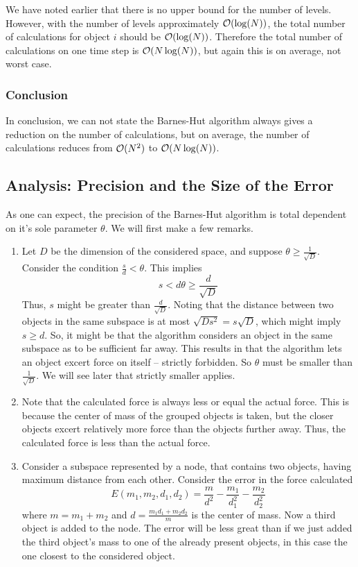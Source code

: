 We have noted earlier that there is no upper bound for the number of levels. 
However, with the number of levels approximately $\mathcal{O}(\log(N))$, the total number of calculations for object $i$ should be $\mathcal{O}(\log(N))$. 
Therefore the total number of calculations on one time step is $\mathcal{O}(N\log(N))$, but again this is on average, not worst case.

\subsubsection*{Conclusion}
In conclusion, we can not state the Barnes-Hut algorithm always gives a reduction on the number of calculations, but on average, the number of calculations reduces from $\mathcal{O}(N^2)$ to $\mathcal{O}(N\log(N))$.

\subsection{Analysis: Precision and the Size of the Error}
As one can expect, the precision of the Barnes-Hut algorithm is total dependent on it's sole parameter $\theta$. We will first make a few remarks.
\begin{enumerate}
\item Let $D$ be the dimension of the considered space, and suppose $\theta \geq \frac{1}{\sqrt{D}}$. Consider the condition $\frac{s}{d} < \theta$. This implies
\[
s < d\theta \geq \frac{d}{\sqrt{D}}
\]
Thus, $s$ might be greater than $\frac{d}{\sqrt{D}}$. Noting that the distance between two objects in the same subspace is at most $\sqrt{Ds^2} = s\sqrt{D}$, which might imply $s\geq d$. 
So, it might be that the algorithm considers an object in the same subspace as to be sufficient far away. 
This results in that the algorithm lets an object excert force on itself -- strictly forbidden. 
So $\theta$ must be smaller than $\frac{1}{\sqrt{D}}$. 
We will see later that strictly smaller applies.
\item Note that the calculated force is always less or equal the actual force. 
This is because the center of mass of the grouped objects is taken, but the closer objects excert relatively more force than the objects further away. 
Thus, the calculated force is less than the actual force.
\item Consider a subspace represented by a node, that contains two objects, having maximum distance from each other. Consider the error in the force calculated
\[
E(m_1,m_2,d_1,d_2) = \frac{m}{d^2}-\frac{m_1}{d_1^2}-\frac{m_2}{d_2^2}
\]
where $m = m_1+m_2$ and $d = \frac{m_1d_1+m_2d_2}{m}$ is the center of mass. 
Now a third object is added to the node. 
The error will be less great than if we just added the third object's mass to one of the already present objects, in this case the one closest to the considered object.
\end{enumerate}